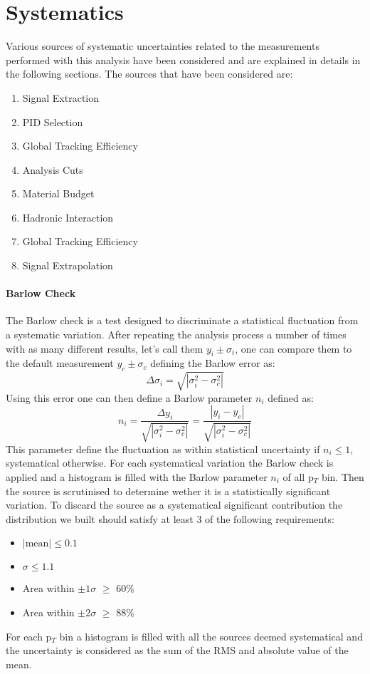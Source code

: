\section{Systematics}
\label{sec:Systematics}
Various sources of systematic uncertainties related to the measurements performed with this analysis have been considered and are explained in details in the following sections. The sources that have been considered are:
\begin{enumerate}
\item Signal Extraction
\item PID Selection
\item	Global Tracking Efficiency
\item	Analysis Cuts
\item Material Budget
\item Hadronic Interaction
\item	Global Tracking Efficiency
\item	Signal Extrapolation
\end{enumerate}

\paragraph{Barlow Check}
The Barlow check is a test designed to discriminate a statistical fluctuation from a systematic variation. After repeating the analysis process a number of times with as many different results, let's call them $y_i \pm \sigma_i$, one can compare them to the default measurement $y_c \pm \sigma_c$ defining the Barlow error as:
\begin{equation}
\Delta\sigma_i = \sqrt{|\sigma_i^2-\sigma_c^2|}
\end{equation}
Using this error one can then define a Barlow parameter $n_i$ defined as:
\begin{equation}
n_i = \frac{\Delta y_i}{\sqrt{|\sigma_i^2-\sigma_c^2|}} =  \frac{|y_i - y_c|}{\sqrt{|\sigma_i^2-\sigma_c^2|}}
\end{equation}
This parameter define the fluctuation as within statistical uncertainty if $n_i \leq 1$, systematical otherwise. For each systematical variation the Barlow check is applied and a histogram is filled with the Barlow parameter $n_i$ of all p$_{T}$ bin. Then the source is scrutinised to determine wether it is a statistically significant variation. To discard the source as a systematical significant contribution the distribution we built should satisfy at least 3 of the following requirements:
\begin{itemize}
\item $|\text{mean}| \leq 0.1$
\item $\sigma \leq 1.1$
\item Area within $\pm 1 \sigma$ $\geq$ 60\%
\item Area within $\pm 2 \sigma$ $\geq$ 88\%
\end{itemize}
For each p$_{T}$ bin a histogram is filled with all the sources deemed systematical and the uncertainty is considered as the sum of the RMS and absolute value of the mean.

